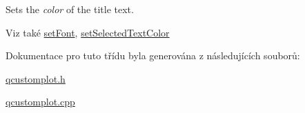 Sets the {\itshape color} of the title text. 

\begin{DoxySeeAlso}{Viz také}
\hyperlink{classQCPPlotTitle_a199fc7170802ea65006c371875349e37}{set\+Font}, \hyperlink{classQCPPlotTitle_a09ffd8c52ac8824d00382f84be391b66}{set\+Selected\+Text\+Color} 
\end{DoxySeeAlso}


Dokumentace pro tuto třídu byla generována z následujících souborů\+:\begin{DoxyCompactItemize}
\item 
\hyperlink{qcustomplot_8h}{qcustomplot.\+h}\item 
\hyperlink{qcustomplot_8cpp}{qcustomplot.\+cpp}\end{DoxyCompactItemize}
